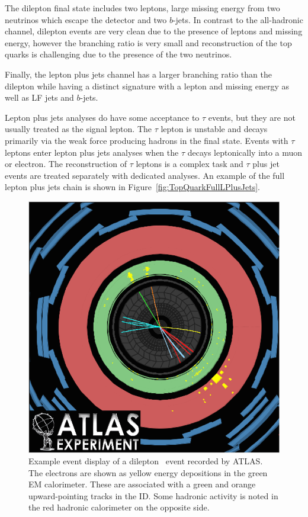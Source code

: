 The dilepton final state includes two leptons, large missing energy from two neutrinos which escape the detector and two $b$-jets. In contrast to the all-hadronic channel, dilepton events are very clean due to the presence of leptons and missing energy, however the branching ratio is very small and reconstruction of the top quarks is challenging due to the presence of the two neutrinos.

Finally, the lepton plus jets channel has a larger branching ratio than the dilepton while having a distinct signature with a lepton and missing energy as well as LF jets and $b$-jets.

Lepton plus jets analyses do have some acceptance to $\tau$ events, but they are not usually treated as the signal lepton. The $\tau$ lepton is unstable and decays primarily via the weak force producing hadrons in the final state. Events with $\tau$ leptons enter lepton plus jets analyses when the $\tau$ decays leptonically into a muon or electron. The reconstruction of $\tau$ leptons is a complex task and $\tau$ plus jet events are treated separately with dedicated analyses. An example of the full lepton plus jets chain is shown in Figure~\ref{fig:TopQuarkFullLPlusJets}.

\begin{figure}[p]
  \centering
  \includegraphics[height=0.65\textheight]{PartTopQuark/Diagrams/atlas-2010-063-fig_09.png}
  \caption{Example event display of a dilepton \ttbar\ event recorded by ATLAS. The electrons are shown as yellow energy depositions in the green EM calorimeter. These are associated with a green and orange upward-pointing tracks in the ID. Some hadronic activity is noted in the red hadronic calorimeter on the opposite side.}\label{fig:TopQuarkEventDisplay}
\end{figure}

